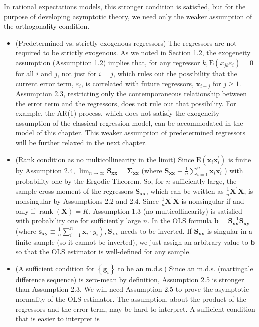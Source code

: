 \documentclass[10pt]{article}
\begin{document}
In rational expectations models, this stronger condition is satisfied, but for the purpose of developing asymptotic theory, we need only the weaker assumption of the orthogonality condition.

\begin{itemize}
  \item (Predetermined vs. strictly exogenous regressors) The regressors are not required to be strictly exogenous. As we noted in Section 1.2, the exogeneity assumption (Assumption 1.2) implies that, for any regressor $k, \mathrm{E}\left(x_{j k} \varepsilon_{i}\right)=0$ for all $i$ and $j$, not just for $i=j$, which rules out the possibility that the current error term, $\varepsilon_{i}$, is correlated with future regressors, $\mathbf{x}_{i+j}$ for $j \geq 1$. Assumption 2.3, restricting only the contemporaneous relationship between the error term and the regressors, does not rule out that possibility. For example, the AR(1) process, which does not satisfy the exogeneity assumption of the classical regression model, can be accommodated in the model of this chapter. This weaker assumption of predetermined regressors will be further relaxed in the next chapter.
  \item (Rank condition as no multicollinearity in the limit) Since $\mathrm{E}\left(\mathbf{x}_{i} \mathbf{x}_{i}^{\prime}\right)$ is finite by Assumption 2.4, $\lim _{n \rightarrow \infty} \mathbf{S}_{\mathbf{x x}}=\mathbf{\Sigma}_{\mathbf{x x}}$ (where $\mathbf{S}_{\mathbf{x x}} \equiv \frac{1}{n} \sum_{i=1}^{n} \mathbf{x}_{i} \mathbf{x}_{i}^{\prime}$ ) with probability one by the Ergodic Theorem. So, for $n$ sufficiently large, the sample cross moment of the regressors $\mathbf{S}_{\mathbf{x x}}$, which can be written as $\frac{1}{n} \mathbf{X}^{\prime} \mathbf{X}$, is nonsingular by Assumptions 2.2 and 2.4. Since $\frac{1}{n} \mathbf{X}^{\prime} \mathbf{X}$ is nonsingular if and only if $\operatorname{rank}(\mathbf{X})=K$, Assumption 1.3 (no multicollinearity) is satisfied with probability one for sufficiently large $n$. In the OLS formula $\mathbf{b}=\mathbf{S}_{\mathbf{x x}}^{-1} \mathbf{S}_{\mathbf{x y}}$ (where $\left.\mathbf{s}_{\mathbf{x y}} \equiv \frac{1}{n} \sum_{i=1}^{n} \mathbf{x}_{i} \cdot y_{i}\right), \mathbf{S}_{\mathbf{x x}}$ needs to be inverted. If $\mathbf{S}_{\mathbf{x x}}$ is singular in a finite sample (so it cannot be inverted), we just assign an arbitrary value to $\mathbf{b}$ so that the OLS estimator is well-defined for any sample.
  \item (A sufficient condition for $\left\{\mathbf{g}_{i}\right\}$ to be an m.d.s.) Since an m.d.s. (martingale difference sequence) is zero-mean by definition, Assumption 2.5 is stronger than Assumption 2.3. We will need Assumption 2.5 to prove the asymptotic normality of the OLS estimator. The assumption, about the product of the regressors and the error term, may be hard to interpret. A sufficient condition that is easier to interpret is
\end{itemize}
\end{document}
